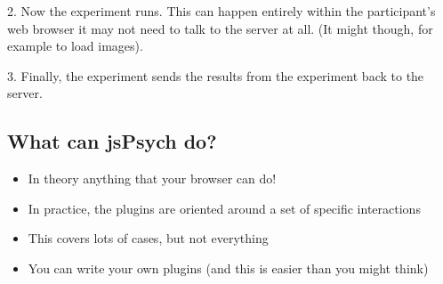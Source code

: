 \documentclass[letterpaper,10pt,english]{sphinxmanual}
\begin{document}
\noindent{}

\begin{DUlineblock}{0em}
\item[] 
\end{DUlineblock}

2. Now the experiment runs. This can happen entirely within the participant’s web
browser \textendash{} it may not need to talk to the server at all. (It might though, for
example to load images).

\begin{DUlineblock}{0em}
\item[] 
\end{DUlineblock}

\noindent{}

\begin{DUlineblock}{0em}
\item[] 
\end{DUlineblock}

3. Finally, the experiment sends the results from the experiment back to the
server.

\begin{DUlineblock}{0em}
\item[] 
\end{DUlineblock}

\noindent{}

\begin{DUlineblock}{0em}
\item[] 
\end{DUlineblock}


\subsection{What can jsPsych do?}
\label{\detokenize{jspsych_au:what-can-jspsych-do}}\begin{itemize}
\item {} 
In theory anything that your browser can do!

\item {} 
In practice, the plugins are oriented around a set of specific interactions

\item {} 
This covers lots of cases, but not everything

\item {} 
You can write your own plugins (and this is easier than you might think)

\end{itemize}
\end{document}

